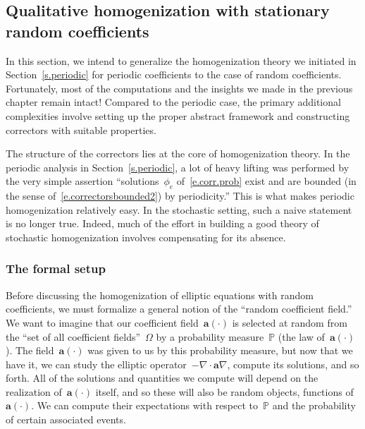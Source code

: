 \documentclass[11pt,twoside]{article} %
\numberwithin{equation}{section}
\theoremstyle{definition}
\renewcommand{\a}{\mathbf{a}}
\renewcommand{\P}{\mathbb{P}}
\begin{document}
\subsection{Qualitative homogenization with stationary random coefficients}
\label{ss.random}

In this section, we intend to generalize the homogenization theory we initiated in Section~\ref{s.periodic} for periodic coefficients to the case of random coefficients. 
Fortunately, most of the computations and the insights we made in the previous chapter remain intact! 
Compared to the periodic case, the primary additional complexities involve setting up the proper abstract framework and constructing correctors with suitable properties. 

\smallskip

The structure of the correctors lies at the core of homogenization theory. In the periodic analysis in Section~\ref{s.periodic}, a lot of heavy lifting was performed by the very simple assertion ``solutions~$\phi_e$ of~\eqref{e.corr.prob} exist and are bounded (in the sense of~\eqref{e.correctorsbounded2}) by periodicity.'' This is what makes periodic homogenization relatively easy. In the stochastic setting, such a naive statement is no longer true. Indeed, much of the effort in building a good theory of stochastic homogenization involves compensating for its absence. 

\smallskip

\subsubsection{The formal setup}

Before discussing the homogenization of elliptic equations with random coefficients, we must formalize a general notion of the ``random coefficient field.'' We want to imagine that our coefficient field~$\a(\cdot)$ is selected at random from the ``set of all coefficient fields''~$\Omega$ by a probability measure~$\mathbb{P}$ (the law of~$\a(\cdot)$). The field~$\a(\cdot)$ was given to us by this probability measure, but now that we have it, we can study the elliptic operator~$-\nabla \cdot \a\nabla$, compute its solutions, and so forth. All of the solutions and quantities we compute will depend on the realization of~$\a(\cdot)$ itself, and so these will also be random objects, functions of~$\a(\cdot)$. We can compute their expectations with respect to~$\P$ and the probability of certain associated events. 


\smallskip
\end{document}
